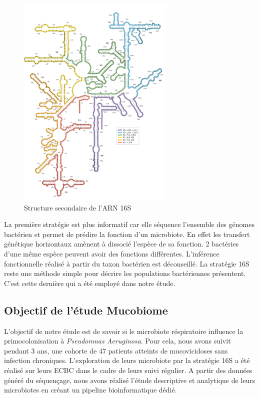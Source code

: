 \documentclass[12pt,a4paper]{article}
\begin{document}
\begin{figure}[ht]
\begin{center}
\includegraphics[scale=0.8]{img/ARN_16S.png}\hfill
\end{center}
\caption{Structure secondaire de l'ARN 16S}
\label{ARN16S}
\end{figure}


La première stratégie est plus informatif car elle séquence l'ensemble des génomes bactérien et permet de prédire la fonction d'un microbiote. En effet les transfert génétique horizontaux amènent à dissocié l'espèce de sa fonction. 2 bactéries d'une même espèce peuvent avoir des fonctions différentes. L'inférence fonctionnelle réalisé à partir du taxon bactérien est déconseillé.  
La stratégie 16S reste une méthode simple pour décrire les populations bactériennes présentent. C'est cette dernière qui a été employé dans notre étude. 


\subsection{Objectif de l'étude Mucobiome}
L'objectif de notre étude est de savoir si le microbiote réspiratoire influence la primocolonisation à \textit{Pseudomnas Aeruginosa}. 
Pour cela, nous avons suivit pendant 3 ans,  une cohorte de 47 patients atteints de mucovicidoses sans infection chroniques. 
L'exploration de leurs microbiote par la stratégie 16S a été réalisé sur leurs ECBC dans le cadre de leurs suivi régulier. 
A partir des données généré du séquençage, nous avons réalisé l'étude descriptive et analytique de leurs microbiotes en créant un pipeline bioinformatique dédié. 
\end{document}
